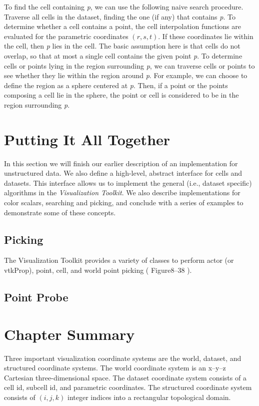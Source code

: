 To find the cell containing \emph{p}, we can use the following naive search procedure.
Traverse all cells in the dataset, finding the one (if any) that contains \emph{p}.
To determine whether a cell contains a point, the cell interpolation functions are evaluated for the parametric coordinates $(r,s,t)$.
If these coordinates lie within the cell, then \emph{p} lies in the cell.
The basic assumption here is that cells do not overlap, so that at most a single cell contains the given point \emph{p}.
To determine cells or points lying in the region surrounding \emph{p}, we can traverse cells or points to see whether they lie within the region around \emph{p}.
For example, we can choose to define the region as a sphere centered at \emph{p}.
Then, if a point or the points composing a cell lie in the sphere, the point or cell is considered to be in the region surrounding \emph{p}.

\section{Putting It All Together}
In this section we will finish our earlier description of an implementation for unstructured data. We also define a high-level, abstract interface for cells and datasets. This interface allows us to implement the general (i.e., dataset specific) algorithms in the \emph{Visualization Toolkit}. We also describe
implementations for color scalars, searching and picking, and conclude with a series of examples to demonstrate some of these concepts.

\subsection{Picking}
\label{subsec:picking}

The Visualization Toolkit provides a variety of classes to perform actor (or vtkProp), point, cell, and
world point picking ( Figure8–38 ).

\subsection{Point Probe}
\label{subsec:point_probe}

\section{Chapter Summary}

Three important visualization coordinate systems are the world, dataset, and structured coordinate systems. The world coordinate system is an x--y--z Cartesian three-dimensional space. The dataset coordinate system consists of a cell id, subcell id, and parametric coordinates. The structured coordinate system consists of $(i,j,k)$ integer indices into a rectangular topological domain.

